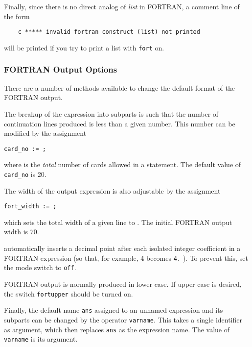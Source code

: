 Finally, since there is no direct analog of \emph{list} in FORTRAN,
a comment line of the form
\begin{verbatim}
    c ***** invalid fortran construct (list) not printed
\end{verbatim}
will be printed if you try to print a list with \texttt{fort} on.

\subsubsection{{FORTRAN} Output Options}
\hypertarget{reserved:FORT_WIDTH}{}
\hypertarget{switch:PERIOD}{}
\hypertarget{switch:FORTUPPER}{}
There are a number of methods available to change the default format of the
FORTRAN output.

The breakup of the expression into subparts is such that the number of
continuation lines produced is less than a given number. This number can
be modified by the assignment
\begin{syntax}
  \texttt{card\_no := }\texttt{;}
\end{syntax}
where  is the \emph{total} number of cards allowed in a
statement. The default value of \texttt{card\_no} is 20.

The width of the output expression is also adjustable by the assignment
\begin{syntax}
  \texttt{fort\_width := }\texttt{;}
\end{syntax}
 which sets the total width of a given line to
.  The initial FORTRAN output width is 70.

{\REDUCE} automatically inserts a decimal point after each isolated integer
coefficient in a FORTRAN expression (so that, for example, 4 becomes
\texttt{4.} ). To prevent this, set the 
mode switch to \texttt{off}.

FORTRAN output is normally produced in lower case.  If upper case is desired,
the switch \texttt{fortupper} should be turned on.

\hypertarget{operator:VARNAME}{}
Finally, the default name \texttt{ans} assigned to an unnamed expression and
its subparts can be changed by the operator \texttt{varname}.
  This takes a single identifier as argument, which then
replaces \texttt{ans} as the expression name.  The value of \texttt{varname} is
its argument.

